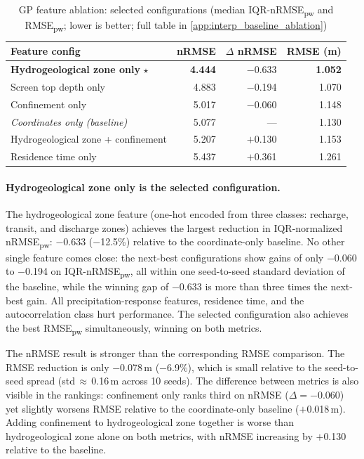 \begin{table}[htbp]
\centering
\begin{tabular}{lrrr}
\toprule
\textbf{Feature config} & \textbf{nRMSE} & \textbf{$\Delta$ nRMSE} & \textbf{RMSE (m)} \\
\midrule
\textbf{Hydrogeological zone only} $\star$    & \textbf{4.444} & $-$0.633 & \textbf{1.052} \\
Screen top depth only                        & 4.883          & $-$0.194 & 1.070 \\
Confinement only                             & 5.017          & $-$0.060 & 1.148 \\
\textit{Coordinates only (baseline)}         & 5.077          & ---      & 1.130 \\
Hydrogeological zone + confinement           & 5.207          & $+$0.130 & 1.153 \\
Residence time only                          & 5.437          & $+$0.361 & 1.261 \\
\bottomrule
\end{tabular}
\caption{GP feature ablation: selected configurations (median IQR-nRMSE\textsubscript{pw} and RMSE\textsubscript{pw}; lower is better; full table in \cref{app:interp_baseline_ablation})}
\label{tab:gp_ablation}
\end{table}

\paragraph{Hydrogeological zone only is the selected configuration.}
The hydrogeological zone feature (one-hot encoded from three classes:
recharge, transit, and discharge zones) achieves the largest reduction in
IQR-normalized nRMSE\textsubscript{pw}: $-$0.633 ($-$12.5\%) relative to the
coordinate-only baseline. No other single feature comes close: the next-best configurations
show gains of only $-$0.060 to $-$0.194 on IQR-nRMSE\textsubscript{pw}, all within one seed-to-seed standard deviation of the
baseline, while the winning gap of $-$0.633 is more than three times the next-best gain. All precipitation-response features, residence time, and the autocorrelation class hurt
performance. The selected configuration also achieves the best RMSE\textsubscript{pw} simultaneously, winning on both metrics.

The nRMSE result is stronger than the corresponding RMSE comparison. The RMSE reduction is
only $-$0.078\,m ($-$6.9\%), which is small relative to the seed-to-seed spread
(std\,$\approx$\,0.16\,m across 10 seeds).
The difference between metrics is also visible in the rankings: confinement only ranks third on
nRMSE ($\Delta = -0.060$) yet slightly worsens RMSE relative to the coordinate-only baseline
($+$0.018\,m). Adding confinement to hydrogeological zone together is worse than hydrogeological zone alone on both metrics,
with nRMSE increasing by $+$0.130 relative to the baseline.

